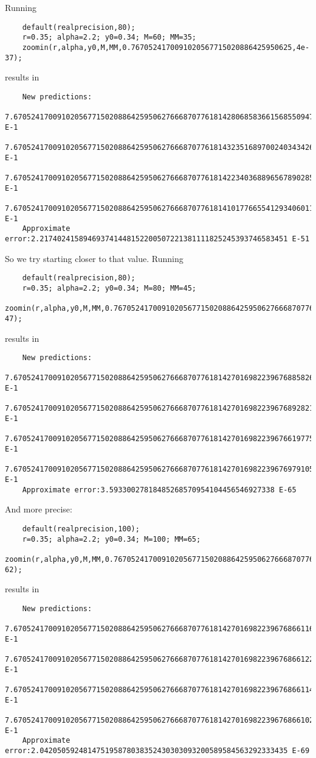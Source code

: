 \documentclass[]{article}
\begin{document}
Running
\begin{verbatim}
	default(realprecision,80);
	r=0.35; alpha=2.2; y0=0.34; M=60; MM=35;
	zoomin(r,alpha,y0,M,MM,0.7670524170091020567715020886425950625,4e-37);
\end{verbatim}
results in 
\begin{verbatim}
	New predictions:
	7.67052417009102056771502088642595062766687077618142806858366156855094778791353590172130106595438 E-1
	7.67052417009102056771502088642595062766687077618143235168970024034342605904962851352719017652213 E-1
	7.67052417009102056771502088642595062766687077618142234036889656789028573116993374108850338642172 E-1
	7.67052417009102056771502088642595062766687077618141017766554129340601157752762344131337905826968 E-1
	Approximate error:2.217402415894693741448152200507221381111825245393746583451 E-51
\end{verbatim}

So we try starting closer to that value.
Running
\begin{verbatim}
	default(realprecision,80);
	r=0.35; alpha=2.2; y0=0.34; M=80; MM=45;
	zoomin(r,alpha,y0,M,MM,0.767052417009102056771502088642595062766687077618,4e-47);
\end{verbatim}
results in
\begin{verbatim}
	New predictions:
	7.67052417009102056771502088642595062766687077618142701698223967688582627703507519701403781776194 E-1
	7.67052417009102056771502088642595062766687077618142701698223967689282128903537979165535461450436 E-1
	7.67052417009102056771502088642595062766687077618142701698223967661977542295045586530478342260844 E-1
	7.67052417009102056771502088642595062766687077618142701698223967697910545076894113387573752706499 E-1
	Approximate error:3.59330027818485268570954104456546927338 E-65
\end{verbatim}

And more precise:
\begin{verbatim}
	default(realprecision,100);
	r=0.35; alpha=2.2; y0=0.34; M=100; MM=65;
	zoomin(r,alpha,y0,M,MM,0.76705241700910205677150208864259506276668707761814270169822396,4e-62);
\end{verbatim}
results in
\begin{verbatim}
	New predictions:
	7.6705241700910205677150208864259506276668707761814270169822396768661164742932102542... E-1
	7.6705241700910205677150208864259506276668707761814270169822396768661225697612949350... E-1
	7.6705241700910205677150208864259506276668707761814270169822396768661147230540627548... E-1
	7.6705241700910205677150208864259506276668707761814270169822396768661021492553701202... E-1
	Approximate error:2.042050592481475195878038352430303093200589584563292333435 E-69
\end{verbatim}
\end{document}
